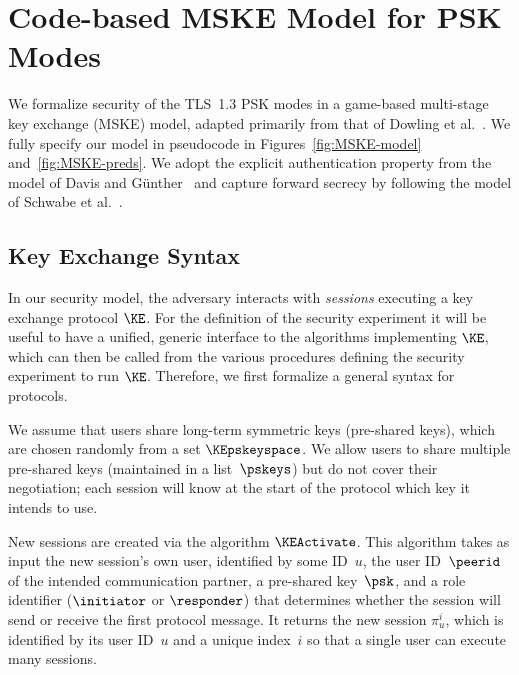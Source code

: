 \section{Code-based MSKE Model for PSK Modes}
\label{sec:ake-model}
We formalize security of the TLS~1.3 PSK modes in a game-based multi-stage key exchange (MSKE) model, adapted primarily from that of Dowling et al.~\cite{JC:DFGS21}. 
We fully specify our model in pseudocode in Figures~\ref{fig:MSKE-model} and~\ref{fig:MSKE-preds}.
We adopt the explicit authentication property from the model of Davis and G{\"u}nther~\cite{ACNS:DavGun21} and capture forward secrecy by following the model of Schwabe et al.~\cite{CCS:SchSteWig20}.


\subsection{Key Exchange Syntax}

In our security model, the adversary interacts with \emph{sessions} executing a key exchange protocol $\KE$.
For the definition of the security experiment it will be useful to have a unified, generic interface to the algorithms implementing $\KE$, which can then be called from the various procedures defining the security experiment to run $\KE$. Therefore, we first formalize a general syntax for protocols.

We assume that users share long-term symmetric keys (pre-shared keys), which are chosen randomly from a set $\KEpskeyspace$.
We allow users to share multiple pre-shared keys (maintained in a list~$\pskeys$) but do not cover their negotiation;
each session will know at the start of the protocol which key it intends to use. 

New sessions are created via the algorithm $\KEActivate$.
This algorithm takes as input the new session's own user, identified by some ID~$u$, the user ID~$\peerid$ of the intended communication partner, a pre-shared key~$\psk$, and a role identifier ($\initiator$ or $\responder$) that determines whether the session will send or receive the first protocol message.
It returns the new session $\pi_u^i$, which is identified by its user ID~$u$ and a unique index~$i$ so that a single user can execute many sessions.


